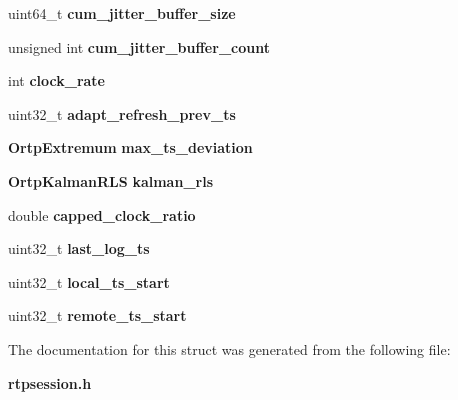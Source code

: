 \begin{DoxyCompactItemize}
uint64\+\_\+t {\bfseries cum\+\_\+jitter\+\_\+buffer\+\_\+size}
\item 
\mbox{\label{struct__JitterControl_a586f8a9767cb0ef95bf882252c347250}} 
unsigned int {\bfseries cum\+\_\+jitter\+\_\+buffer\+\_\+count}
\item 
\mbox{\label{struct__JitterControl_a2931ad19e7ebf15721fb563a345c0164}} 
int {\bfseries clock\+\_\+rate}
\item 
\mbox{\label{struct__JitterControl_adb4cf383a0c173903f3096defcacd55a}} 
uint32\+\_\+t {\bfseries adapt\+\_\+refresh\+\_\+prev\+\_\+ts}
\item 
\mbox{\label{struct__JitterControl_ade5c3c91abdbf5d1787c84ec70a65401}} 
\textbf{ Ortp\+Extremum} {\bfseries max\+\_\+ts\+\_\+deviation}
\item 
\mbox{\label{struct__JitterControl_a8083ca87a83325c2bdda64f85d4d6266}} 
\textbf{ Ortp\+Kalman\+R\+LS} {\bfseries kalman\+\_\+rls}
\item 
\mbox{\label{struct__JitterControl_a34181853c5c32c39ef2e03cb8c305e90}} 
double {\bfseries capped\+\_\+clock\+\_\+ratio}
\item 
\mbox{\label{struct__JitterControl_aaecc468680b14c90bfac2916ce50fa0d}} 
uint32\+\_\+t {\bfseries last\+\_\+log\+\_\+ts}
\item 
\mbox{\label{struct__JitterControl_af3062ca8d0335858b2734999a20e83e7}} 
uint32\+\_\+t {\bfseries local\+\_\+ts\+\_\+start}
\item 
\mbox{\label{struct__JitterControl_a86985818b5af3b8bbcbc50ab0049f3ac}} 
uint32\+\_\+t {\bfseries remote\+\_\+ts\+\_\+start}
\end{DoxyCompactItemize}


The documentation for this struct was generated from the following file\+:\begin{DoxyCompactItemize}
\item 
\textbf{ rtpsession.\+h}\end{DoxyCompactItemize}
